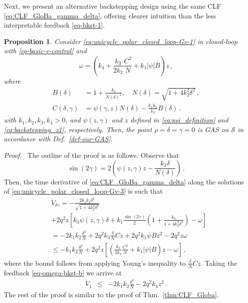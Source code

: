 \documentclass[journal,twoside,web]{ieeecolor}
\theoremstyle{definition}
\newtheorem{proposition}{Proposition}
\renewenvironment{proof}[1][Proof]{\par\pushQED{\qed}\normalfont\textit{#1.}~}{\popQED\par}
\begin{document}
Next, we present an alternative backstepping design using the same CLF \eqref{eq:CLF_GloBa_gamma_delta}, offering clearer intuition than the less interpretable feedback \eqref{eq-bkst-1}.
\begin{proposition} \em
    Consider \eqref{eq:unicycle_polar_closed_loop-Gv-1} in closed-loop with \eqref{eq-basic-v-control} and 
    \begin{equation}
    \label{eq-omega-bkst-b}
 \omega = \left( k_4 + \frac{k_3}{2k_2}\frac{C^2}{N} + k_1|\psi|B\right) z \,,
\end{equation}
where 
\begin{align}
B(\delta) &= 1+\frac{k_2}{N(\delta)^2}, \quad N(\delta) = \sqrt{1+4k_2^2\delta^2} \,, \label{eq:N_delta_def} \\
C(\delta, \gamma) &=  \psi(\gamma, z) N(\delta) - \frac{k_1 k_2}{k_3} B(\delta)\,.
\end{align}
with $k_1, k_2, k_3, k_4 > 0$, and $\psi(z,\gamma)$ and $z$ defined in \eqref{eq:psi_definition} and \eqref{eq:backstepping_z1}, respectively.  Then, the point $\rho = \delta = \gamma = 0$ is GAS on $\mathcal{S}$ in accordance with Def.~\ref{def-our-GAS}.
\end{proposition}
\raggedbottom
\begin{proof}
    The outline of the proof is as follows. Observe that 
    \begin{equation}
        \sin(2\gamma) = 2 \left(\psi(z,\gamma) z- \frac{k_2\delta}{N(\delta)}\right) \,.
    \end{equation} Then, the time derivative of \eqref{eq:CLF_GloBa_gamma_delta} along the solutions of \eqref{eq:unicycle_polar_closed_loop-Gv-3} is such that
\begin{align}
&\dot V_{\delta \gamma} =   -\frac{2 k_1 k_2  \delta^2}{\sqrt{1+4 k_2^2 \delta^2}} \nonumber\\
&+   2 q^2 z\left[  k_3 \psi(z,\gamma) \delta + k_1  \frac{\sin (2\gamma)}{2} \left(1 + \frac{k_2}{1+4k_2^2\delta^2} \right)- \omega\right] \nonumber \\
&= -2 k_1 k_2 \frac{\delta^2}{N} +2 q ^2 k_3 \frac{\delta}{N}Cz + 2 q^2 k_1 \psi B z^2 - 2 q^2 z\omega \nonumber \\
&\leq  -  k_1 k_2 \frac{\delta^2}{N}+ 2 q ^2 z \left[\left( \frac{k_3}{2k_2}\frac{C^2}{N} + k_1|\psi|B\right) z - \omega
\right] \,, \label{eq-V1dot-bkst1a}
\end{align}
where the bound follows from applying Young's inequality to $\frac{\delta}{N}Cz$. 
Taking the feedback \eqref{eq-omega-bkst-b}
we arrive at
\begin{eqnarray}
\label{eq-V1dot-bkst1b}
\dot V_1 &\leq & - 2 k_1 k_2 \frac{\delta^2}{N} - 2 q^2 k_4 z^2
\,. 
\end{eqnarray}
The rest of the proof is similar to the proof of Thm.~\ref{thm:CLF_Globa}.
\end{proof}
\end{document}
